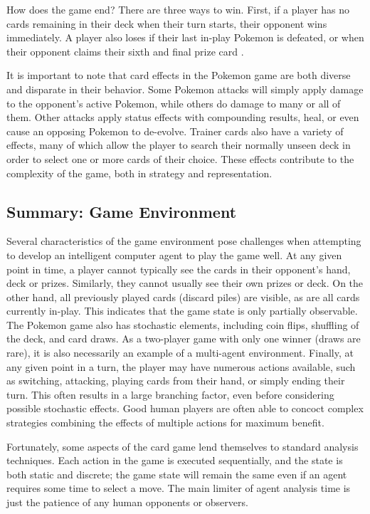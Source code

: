 \documentclass{article}
\begin{document}
How does the game end? There are three ways to win.  First, if a player has no cards remaining in their deck when their turn starts, their opponent wins immediately.  A player also loses if their last in-play Pokemon is defeated, or when their opponent claims their sixth and final prize card \cite{pkmn}.

It is important to note that card effects in the Pokemon game are both diverse and disparate in their behavior.  Some Pokemon attacks will simply apply damage to the opponent's active Pokemon, while others do damage to many or all of them.  Other attacks apply status effects with compounding results, heal, or even cause an opposing Pokemon to de-evolve.  Trainer cards also have a variety of effects, many of which allow the player to search their normally unseen deck in order to select one or more cards of their choice.  These effects contribute to the complexity of the game, both in strategy and representation.

\subsection{Summary: Game Environment} %

Several characteristics of the game environment pose challenges when attempting to develop an intelligent computer agent to play the game well.  At any given point in time, a player cannot typically see the cards in their opponent's hand, deck or prizes.  Similarly, they cannot usually see their own prizes or deck.  On the other hand, all previously played cards (discard piles) are visible, as are all cards currently in-play.  This indicates that the game state is only partially observable.  The Pokemon game also has stochastic elements, including coin flips, shuffling of the deck, and card draws.  As a two-player game with only one winner (draws are rare), it is also necessarily an example of a multi-agent environment.  Finally, at any given point in a turn, the player may have numerous actions available, such as switching, attacking, playing cards from their hand, or simply ending their turn.  This often results in a large branching factor, even before considering possible stochastic effects.  Good human players are often able to concoct complex strategies combining the effects of multiple actions for maximum benefit.

Fortunately, some aspects of the card game lend themselves to standard analysis techniques.  Each action in the game is executed sequentially, and the state is both static and discrete; the game state will remain the same even if an agent requires some time to select a move.  The main limiter of agent analysis time is just the patience of any human opponents or observers.
\end{document}
